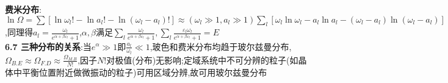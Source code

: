 \documentclass[10pt,a4paper]{article}
\begin{document}
\begin{multicols}{2}
\textbf{费米分布}:$\ln\Omega=\sum[\ln\omega_l!-\ln a_l!-\ln(\omega_l-a_l)!]\approx(\omega_l\gg1,a_l\gg1)\sum_l[\omega_l\ln\omega_l-a_l\ln a_l-(\omega_l-a_l)\ln(\omega_l-a_l)]$,同理得$a_l=\frac{\omega_l}{e^{\alpha+\beta\varepsilon_l}+1}$,$\alpha,\beta$满足$\sum_l\frac{\omega_l}{e^{\alpha+\beta\varepsilon_l}+1},\sum_l\frac{\varepsilon_l\omega_l}{e^{\alpha+\beta\varepsilon_l}+1}=E$\\
\textbf{6.7 三种分布的关系}:当$e^{\alpha}\gg1$即$\frac{a_l}{\omega_l}\ll1$,玻色和费米分布均趋于玻尔兹曼分布,$\Omega_{B.E}\approx\Omega_{F.D}\approx\frac{\Omega_{M.B}}{N!}$,因子$N!$对极值(分布)无影响;定域系统中不可分辨的粒子(如晶体中平衡位置附近做微振动的粒子)可用区域分辨,故可用玻尔兹曼分布
\end{multicols}
\end{document}
